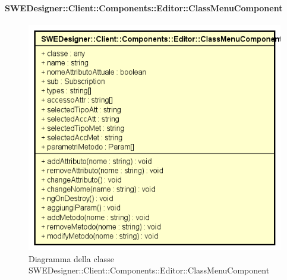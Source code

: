           	\paragraph{SWEDesigner::Client::Components::Editor::ClassMenuComponent}
          	\begin{figure}[h!]
			\centering
			\includegraphics[scale=0.8]{Classi/SWEDesigner__Client__Components__Editor__ClassMenuComponent.png}
			\caption{Diagramma della classe SWEDesigner::Client::Components::Editor::ClassMenuComponent}
 			\end{figure}
